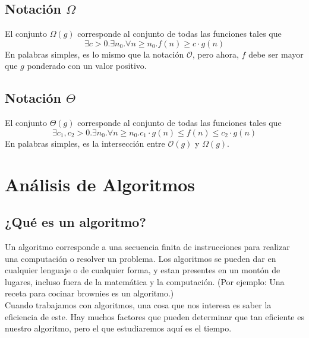 \documentclass[../main.tex]{subfiles}
\begin{document}
\subsection[Notación Omega]{Notación $\Omega$}
El conjunto $\Omega(g)$ corresponde al conjunto de todas las funciones tales que
\[ \exists c > 0 . \exists n_0 . \forall n \geq n_0 . f(n) \geq c \cdot g(n) \]
En palabras simples, es lo mismo que la notación $\mathcal{O}$, pero ahora, $f$ debe ser mayor que $g$ ponderado con un valor positivo.

\subsection[Notación Theta]{Notación $\Theta$}
El conjunto $\Theta(g)$ corresponde al conjunto de todas las funciones tales que
\[ \exists c_1, c_2 > 0 . \exists n_0 . \forall n \geq n_0 . c_1 \cdot g(n) \leq f(n) \leq c_2 \cdot g(n) \]
En palabras simples, es la intersección entre $\mathcal{O}(g)$ y $\Omega(g)$.

\section{Análisis de Algoritmos}
\subsection{¿Qué es un algoritmo?}
Un algoritmo corresponde a una secuencia finita de instrucciones para realizar una computación o resolver un problema. Los algoritmos se pueden dar en cualquier lenguaje o de cualquier forma, y estan presentes en un montón de lugares, incluso fuera de la matemática y la computación. (Por ejemplo: Una receta para cocinar brownies es un algoritmo.)\\
Cuando trabajamos con algoritmos, una cosa que nos interesa es saber la eficiencia de este. Hay muchos factores que pueden determinar que tan eficiente es nuestro algoritmo, pero el que estudiaremos aquí es el tiempo.
\end{document}
